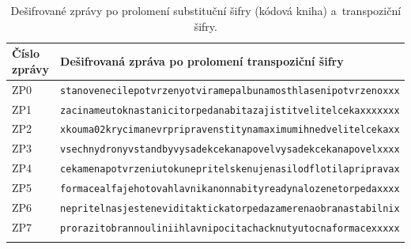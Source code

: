 \documentclass[a4paper, 11pt]{article}
\begin{document}
\begin{longtable}{ll}
    \toprule
    \textbf{Číslo zprávy} & \textbf{Dešifrovaná zpráva po prolomení transpoziční šifry} \\ 
    \midrule
    \endhead
    ZP0 & \texttt{stanovenecilepotvrzenyotviramepalbunamosthlasenipotvrzenoxxx} \\ 
    ZP1 & \texttt{zacinameutoknastanicitorpedanabitazajistitvelitelcekaxxxxxxx} \\
    ZP2 & \texttt{xkouma02krycimanevrpripravenstitynamaximumihnedvelitelcekaxx} \\
    ZP3 & \texttt{vsechnydronyvstandbyvysadekcekanapovelvysadekcekanapovelxxxx} \\
    ZP4 & \texttt{cekamenapotvrzeniutokunepritelskenujenasilodflotilapripravax} \\
    ZP5 & \texttt{formacealfajehotovahlavnikanonnabityreadynalozenetorpedaxxxx} \\
    ZP6 & \texttt{nepritelnasjesteneviditaktickatorpedazamerenaobranastabilnix} \\
    ZP7 & \texttt{prorazitobrannouliniihlavnipocitachacknutyutocnaformacexxxxx} \\
    \bottomrule
    \addlinespace[8.5pt]
    \caption{Dešifrované zprávy po prolomení substituční šifry (kódová kniha) a~transpoziční šifry.}
\end{longtable}
\end{document}
